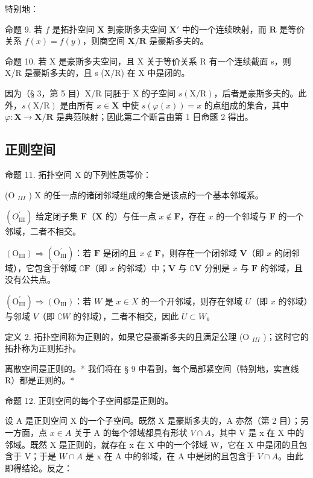 特别地：

命题 9. 若 \(f\) 是拓扑空间 \(\mathbf{X}\) 到豪斯多夫空间 \(\mathbf{X}'\) 中的一个连续映射，而 \(\mathbf{R}\) 是等价关系 \(f(x) = f(y)\)，则商空间 \(\mathbf{X} / \mathbf{R}\) 是豪斯多夫的。

命题 10. 若 X 是豪斯多夫空间，且 X 关于等价关系 R 有一个连续截面 s，则 X/R 是豪斯多夫的，且 s (X/R) 在 X 中是闭的。

因为（§ 3，第 5 目）X/R 同胚于 X 的子空间 \(s(\mathrm{X}/\mathrm{R})\)，后者是豪斯多夫的。此外，\(s(\mathrm{X}/\mathrm{R})\) 是由所有 \(x \in \mathbf{X}\) 中使 \(s(\varphi(x)) = x\) 的点组成的集合，其中 \(\varphi: \mathbf{X} \to \mathbf{X}/\mathbf{R}\) 是典范映射；因此第二个断言由第 1 目命题 2 得出。

\subsection{正则空间}

命题 11. 拓扑空间 X 的下列性质等价：

(O \(_{III}\) ) X 的任一点的诸闭邻域组成的集合是该点的一个基本邻域系。

\((O_{\mathrm{III}}^{\prime})\) 给定闭子集 \(\mathbf{F}\)（\(\mathbf{X}\) 的）与任一点 \(x \notin \mathbf{F}\)，存在 \(x\) 的一个邻域与 \(\mathbf{F}\) 的一个邻域，二者不相交。

\((\mathrm{O}_{\mathrm{III}}) \Longrightarrow (\mathrm{O}_{\mathrm{III}}^{\prime})\)：若 \(\mathbf{F}\) 是闭的且 \(x \notin \mathbf{F}\)，则存在一个闭邻域 \(\mathbf{V}\)（即 \(x\) 的闭邻域），它包含于邻域 \(\complement \mathbf{F}\)（即 \(x\) 的邻域）中；\(\mathbf{V}\) 与 \(\complement \mathbf{V}\) 分别是 \(x\) 与 \(\mathbf{F}\) 的邻域，且没有公共点。

\((\mathrm{O}_{\mathrm{III}}^{\prime}) \Longrightarrow (\mathrm{O}_{\mathrm{III}})\)：若 \(W\) 是 \(x \in X\) 的一个开邻域，则存在邻域 \(U\)（即 \(x\) 的邻域）与邻域 \(V\)（即 \(\complement W\) 的邻域），二者不相交，因此 \(\overline{U} \subset W\)。

定义 2. 拓扑空间称为正则的，如果它是豪斯多夫的且满足公理 (O \(_{III}\) )；这时它的拓扑称为正则拓扑。

离散空间是正则的。* 我们将在 § 9 中看到，每个局部紧空间（特别地，实直线 R）都是正则的。*

命题 12. 正则空间的每个子空间都是正则的。

设 A 是正则空间 X 的一个子空间。既然 X 是豪斯多夫的，A 亦然（第 2 目）；另一方面，点 \(x \in A\) 关于 A 的每个邻域都具有形状 \(V \cap A\)，其中 V 是 x 在 X 中的邻域。既然 X 是正则的，就存在 x 在 X 中的一个邻域 W，它在 X 中是闭的且包含于 V；于是 \(W \cap A\) 是 x 在 A 中的邻域，在 A 中是闭的且包含于 \(V \cap A\)。由此即得结论。反之：

